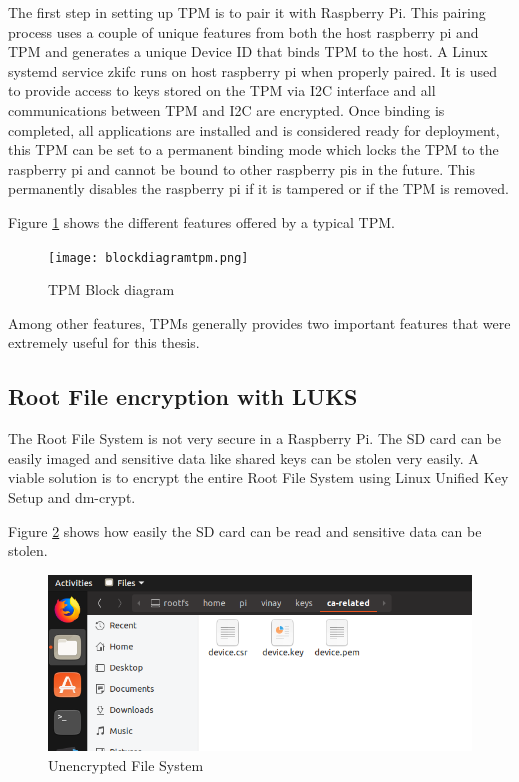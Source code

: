 \documentclass[11pt,openright]{report}
\begin{document}
The first step in setting up TPM is to pair it with Raspberry Pi. This pairing process uses a couple of unique features from both the host raspberry pi and TPM and generates a unique Device ID that binds TPM to the host. A Linux systemd service zkifc runs on host raspberry pi when properly paired. It is used to provide access to keys stored on the TPM via I2C interface and all communications between TPM and I2C are encrypted. Once binding is completed, all applications are installed and is considered ready for deployment, this TPM can be set to a permanent binding mode which locks the TPM to the raspberry pi and cannot be bound to other raspberry pis in the future. This permanently disables the raspberry pi if it is tampered or if the TPM is removed.

Figure \ref{fig:blockdiagramtpm} shows the different features offered by a typical TPM.
\newpage
\hfill\\
\begin{figure}[!htbp]
	\centering
	\texttt{[image: blockdiagramtpm.png]}
	\caption{TPM Block diagram}
	\label{fig:blockdiagramtpm}
\end{figure}
\newline
\newline
Among other features, TPMs generally provides two important features that were extremely useful for this thesis.
\subsection{Root File encryption with LUKS}
The Root File System is not very secure in a Raspberry Pi. The SD card can be easily imaged and sensitive data like shared keys can be stolen very easily. A viable solution is to encrypt the entire Root File System using Linux Unified Key Setup and dm-crypt.

Figure \ref{fig:normal_fs} shows how easily the SD card can be read and sensitive data can be stolen.
\newpage
\hfill\\
\begin{figure}[!htbp]
    \centering
    \includegraphics[scale=1]{images/3_NormalFS.png}
    \caption{Unencrypted File System}
    \label{fig:normal_fs}
\end{figure}
\newline
\newline
\end{document}
